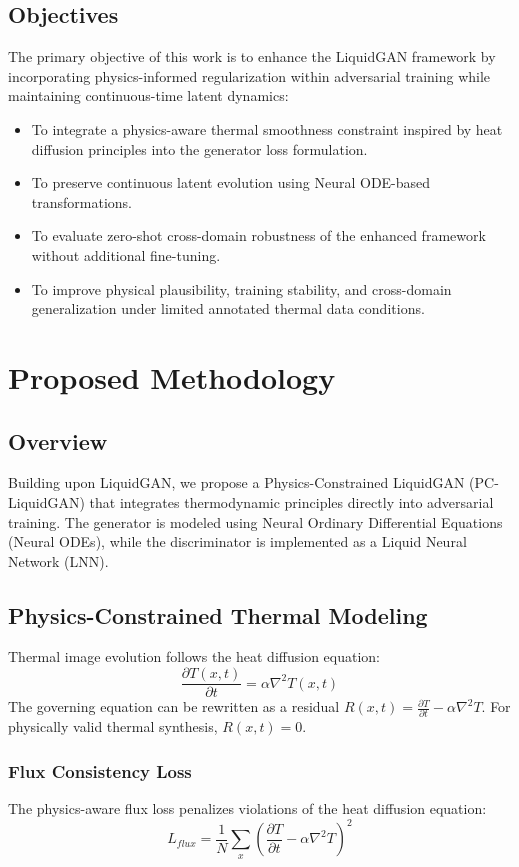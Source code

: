 \documentclass[12pt,a4paper]{report}
\begin{document}
\section{Objectives}
The primary objective of this work is to enhance the LiquidGAN framework by incorporating physics-informed regularization within adversarial training while maintaining continuous-time latent dynamics:
\begin{itemize}
    \item To integrate a physics-aware thermal smoothness constraint inspired by heat diffusion principles into the generator loss formulation.
    \item To preserve continuous latent evolution using Neural ODE-based transformations.
    \item To evaluate zero-shot cross-domain robustness of the enhanced framework without additional fine-tuning.
    \item To improve physical plausibility, training stability, and cross-domain generalization under limited annotated thermal data conditions.
\end{itemize}

\chapter{Proposed Methodology}
\section{Overview}
Building upon LiquidGAN, we propose a Physics-Constrained LiquidGAN (PC-LiquidGAN) that integrates thermodynamic principles directly into adversarial training. The generator is modeled using Neural Ordinary Differential Equations (Neural ODEs), while the discriminator is implemented as a Liquid Neural Network (LNN).

\section{Physics-Constrained Thermal Modeling}
Thermal image evolution follows the heat diffusion equation:
\begin{equation}
    \frac{\partial T(x, t)}{\partial t} = \alpha \nabla^2 T(x, t)
\end{equation}
The governing equation can be rewritten as a residual $R(x, t) = \frac{\partial T}{\partial t} - \alpha \nabla^2 T$. For physically valid thermal synthesis, $R(x, t) = 0$.

\subsection{Flux Consistency Loss}
The physics-aware flux loss penalizes violations of the heat diffusion equation:
\begin{equation}
    L_{flux} = \frac{1}{N} \sum_x \left( \frac{\partial T}{\partial t} - \alpha \nabla^2 T \right)^2
\end{equation}
\end{document}

